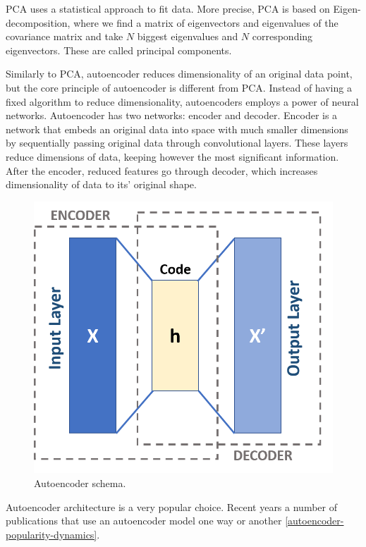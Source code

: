 PCA uses a statistical approach to fit data. More precise, PCA is based on Eigen-decomposition, where we find a matrix of eigenvectors and eigenvalues of the covariance matrix and take $N$ biggest eigenvalues and $N$ corresponding eigenvectors. These are called principal components.

Similarly to PCA, autoencoder reduces dimensionality of an original data point, but the core principle of autoencoder is different from PCA. Instead of having a fixed algorithm to reduce dimensionality, autoencoders employs a power of neural networks. Autoencoder has two networks: encoder and decoder. Encoder is a network that embeds an original data into space with much smaller dimensions by sequentially passing original data through convolutional layers. These layers reduce dimensions of data, keeping however the most significant information. After the encoder, reduced features go through decoder, which increases dimensionality of data to its' original shape.

\begin{figure}[!ht]
    \centering
    \includegraphics[width=\textwidth]{figure/Autoencoder_schema.png}
    \caption{Autoencoder schema.}
    \label{autoencoder-schema}
\end{figure}

Autoencoder architecture is a very popular choice. Recent years a number of publications that use an autoencoder model one way or another \ref{autoencoder-popularity-dynamics}.

